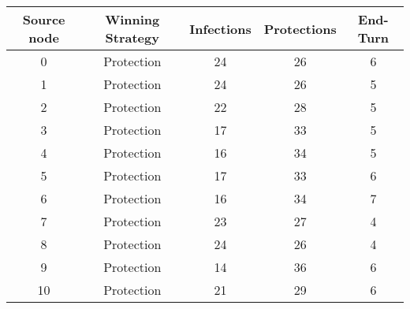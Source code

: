 \documentclass[results.tex]{subfiles}
\begin{document}
    \begin{center}
        \begin{tabular}{| c || c | c | c | c |}
            \hline
            {\bfseries Source node} & {\bfseries Winning Strategy} & {\bfseries Infections} & {\bfseries Protections}
            & {\bfseries End-Turn}
            \\  %
            \hline\hline
            0                       & Protection                   & 24                     & 26                      & 6                    \\
            \hline
            1                       & Protection                   & 24                     & 26                      & 5                    \\
            \hline
            2                       & Protection                   & 22                     & 28                      & 5                    \\
            \hline
            3                       & Protection                   & 17                     & 33                      & 5                    \\
            \hline
            4                       & Protection                   & 16                     & 34                      & 5                    \\
            \hline
            5                       & Protection                   & 17                     & 33                      & 6                    \\
            \hline
            6                       & Protection                   & 16                     & 34                      & 7                    \\
            \hline
            7                       & Protection                   & 23                     & 27                      & 4                    \\
            \hline
            8                       & Protection                   & 24                     & 26                      & 4                    \\
            \hline
            9                       & Protection                   & 14                     & 36                      & 6                    \\
            \hline
            10                      & Protection                   & 21                     & 29                      & 6                    \\

\end{tabular}
\end{center}
\end{document}
